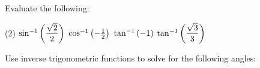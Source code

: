 \documentclass[../mathNotesPreamble]{subfiles}
\begin{document}
  \begin{ex*}
    Evaluate the following:
    \begin{extasks}[after-item-skip=\stretch{1}](2)
      \task $\sin^{-1}{\left(\dfrac{\sqrt{2}}{2}\right)}$
      \task $\cos^{-1}{\left(-\frac{1}{2}\right)}$
      \task $\tan^{-1}{\left(-1\right)}$
      \task $\tan^{-1}{\left(\dfrac{\sqrt{3}}{3}\right)}$
    \end{extasks}
  \end{ex*}

  \begin{ex*}
    Use inverse trigonometric functions to solve for the following angles:
    \vspace*{\baselineskip}


\end{ex*}
\end{document}
